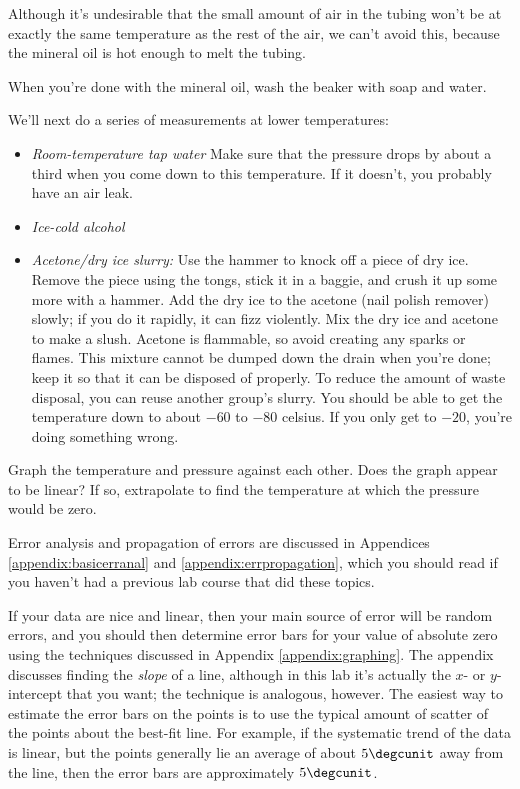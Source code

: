 Although it's undesirable that the small amount of air in the tubing
won't be at exactly the same temperature as the rest of the air, we can't
avoid this, because the mineral oil is hot enough to melt the tubing.

When you're done with the mineral oil, wash the beaker with soap and water.

We'll next do a series of measurements at lower temperatures:

\begin{itemize}
\item \emph{Room-temperature tap water} Make sure that the pressure
drops by about a third when you come down to this temperature. If it
doesn't, you probably have an air leak.

\item \emph{Ice-cold alcohol}

\item \emph{Acetone/dry ice slurry:}
Use the hammer to knock off a piece of dry ice. Remove the piece
using the tongs, stick it in a baggie, and crush it up some more
with a hammer.
Add the dry ice to the acetone (nail polish remover) slowly; if you
do it rapidly, it can fizz violently.
Mix the dry ice and acetone to make a slush.
Acetone is flammable, so avoid creating any sparks or flames.
This mixture cannot be dumped down the drain when you're done;
keep it so that it can be disposed of properly. To reduce the amount
of waste disposal, you can reuse another group's slurry.
You should be able to get the temperature down to about $-60$ to
$-80$ celsius. If you only get to $-20$, you're doing something wrong.
\end{itemize}

\analysis

Graph the temperature and pressure against each other. Does
the graph appear to be linear? If so, extrapolate to find
the temperature at which the pressure would be zero. 

Error analysis and propagation of errors are discussed in
Appendices \ref{appendix:basicerranal} and \ref{appendix:errpropagation},
which you should read if you haven't had a previous lab course that
did these topics.

If your data are nice and linear, then your main source of
error will be random errors, and you should then determine
error bars for your value of absolute zero using the
techniques discussed in Appendix \ref{appendix:graphing}.
The appendix discusses finding the \emph{slope} of a line,
although in this lab it's actually the $x$- or $y$-intercept that you want;
the technique is analogous, however.
The easiest way to estimate the error bars on the points
is to use the typical amount of scatter of the points about
the best-fit line. For example, if the systematic trend of the
data is linear, but the points generally lie an average of
about $5\degcunit$ away from the line, then the error bars
are approximately $5\degcunit$.

